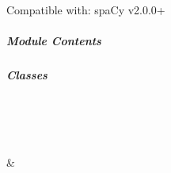 \documentclass[letterpaper,10pt,english]{sphinxmanual}
\begin{document}
\sphinxAtStartPar
Compatible with: spaCy v2.0.0+


\subparagraph{Module Contents}
\label{\detokenize{autoapi/pine/pipelines/spacy_NER_pipeline/index:module-contents}}

\subparagraph{Classes}
\label{\detokenize{autoapi/pine/pipelines/spacy_NER_pipeline/index:classes}}

\begin{savenotes}\sphinxatlongtablestart\begin{longtable}[c]{}
\hline

\endfirsthead

%
{}\\
\hline

\endhead

\hline
{}\\
\endfoot

\endlastfoot

\sphinxAtStartPar
{\hyperref[\detokenize{autoapi/pine/pipelines/spacy_NER_pipeline/index:pine.pipelines.spacy_NER_pipeline.spacy_NER}]{}}
&
\sphinxAtStartPar

\\
\hline
\end{longtable}\sphinxatlongtableend\end{savenotes}
\end{document}

